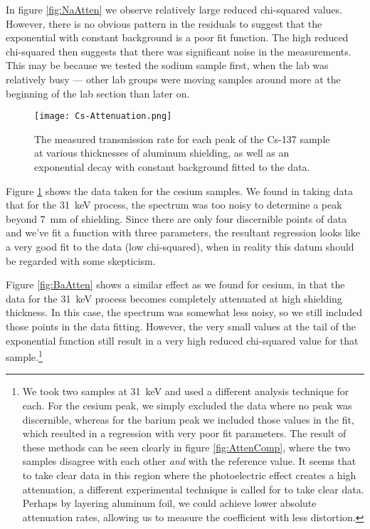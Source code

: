 \documentclass[letter]{article}
\begin{document}
In figure \ref{fig:NaAtten} we observe relatively large reduced chi-squared values. However, there is no obvious pattern in the residuals to suggest that the exponential with constant background is a poor fit function. The high reduced chi-squared then suggests that there was significant noise in the measurements. This may be because we tested the sodium sample first, when the lab was relatively busy --- other lab groups were moving samples around more at the beginning of the lab section than later on.

\begin{figure}[h] \centering
    \texttt{[image: Cs-Attenuation.png]}
    \caption{The measured transmission rate for each peak of the Cs-137 sample at various thicknesses of aluminum shielding, as well as an exponential decay with constant background fitted to the data.}
    \label{fig:CsAtten}
\end{figure}

Figure \ref{fig:CsAtten} shows the data taken for the cesium samples. We found in taking data that for the \qty{31}{\kilo\electronvolt} process, the spectrum was too noisy to determine a peak beyond \qty{7}{\mm} of shielding. Since there are only four discernible points of data and we've fit a function with three parameters, the resultant regression looks like a very good fit to the data (low chi-squared), when in reality this datum should be regarded with some skepticism.


Figure \ref{fig:BaAtten} shows a similar effect as we found for cesium, in that the data for the \qty{31}{\kilo\electronvolt} process becomes completely attenuated at high shielding thickness. In this case, the spectrum was somewhat less noisy, so we still included those points in the data fitting. However, the very small values at the tail of the exponential function still result in a very high reduced chi-squared value for that sample.\footnote{
    We took two samples at \qty{31}{\kilo\electronvolt} and used a different analysis technique for each. For the cesium peak, we simply excluded the data where no peak was discernible, whereas for the barium peak we included those values in the fit, which resulted in a regression with very poor fit parameters. The result of these methods can be seen clearly in figure \ref{fig:AttenComp}, where the two samples disagree with each other \textit{and} with the reference value. It seems that to take clear data in this region where the photoelectric effect creates a high attenuation, a different experimental technique is called for to take clear data. Perhaps by layering aluminum foil, we could achieve lower absolute attenuation rates, allowing us to measure the coefficient with less distortion.
}
\end{document}
